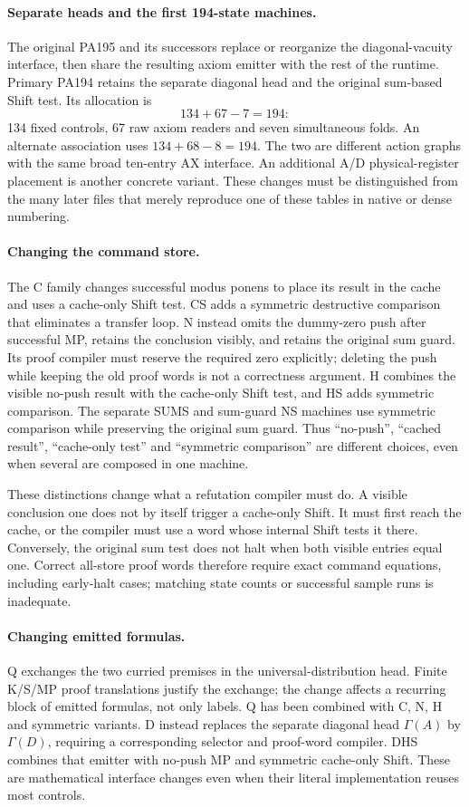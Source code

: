 \paragraph{Separate heads and the first 194-state machines.}
The original PA195 and its successors replace or reorganize the
diagonal-vacuity interface, then share the resulting axiom emitter with the
rest of the runtime.  Primary PA194 retains the separate diagonal head and
the original sum-based Shift test.  Its allocation is
\[
                  134+67-7=194:
\]
134 fixed controls, 67 raw axiom readers and seven simultaneous folds.
An alternate association uses $134+68-8=194$.  The two are different
action graphs with the same broad ten-entry AX interface.  An additional
A/D physical-register placement is another concrete variant.  These
changes must be distinguished from the many later files that merely
reproduce one of these tables in native or dense numbering.

\paragraph{Changing the command store.}
The C family changes successful modus ponens to place its result in the
cache and uses a cache-only Shift test.  CS adds a symmetric destructive
comparison that eliminates a transfer loop.  N instead omits the dummy-zero
push after successful MP, retains the conclusion visibly, and retains the
original sum guard.  Its proof compiler must reserve the required zero
explicitly; deleting the push while keeping the old proof words is not a
correctness argument.  H combines the visible no-push result with the
cache-only Shift test, and HS adds symmetric comparison.  The separate
SUMS and sum-guard NS machines use symmetric comparison while preserving
the original sum guard.  Thus ``no-push'', ``cached result'', ``cache-only
test'' and ``symmetric comparison'' are different choices, even when
several are composed in one machine.

These distinctions change what a refutation compiler must do.  A visible
conclusion one does not by itself trigger a cache-only Shift.  It must
first reach the cache, or the compiler must use a word whose internal
Shift tests it there.  Conversely, the original sum test does not halt
when both visible entries equal one.  Correct all-store proof words
therefore require exact command equations, including early-halt cases;
matching state counts or successful sample runs is inadequate.

\paragraph{Changing emitted formulas.}
Q exchanges the two curried premises in the universal-distribution head.
Finite K/S/MP proof translations justify the exchange; the change affects
a recurring block of emitted formulas, not only labels.  Q has been
combined with C, N, H and symmetric variants.  D instead replaces the
separate diagonal head $\Gamma(A)$ by $\Gamma(D)$, requiring a corresponding
selector and proof-word compiler.  DHS combines that emitter with no-push
MP and symmetric cache-only Shift.  These are mathematical interface
changes even when their literal implementation reuses most controls.


